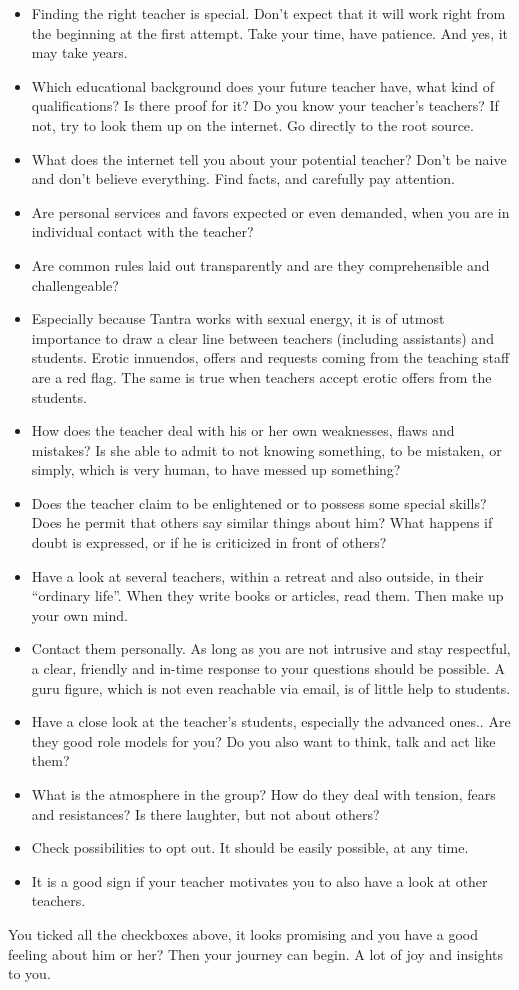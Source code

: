 \begin{itemize}
\item Finding the right teacher is special. Don't expect that it will work right from the beginning at the first attempt. Take your time, have patience. And yes, it may take years.
\item Which educational background does your future teacher have, what kind of qualifications? Is there proof for it? Do you know your teacher's teachers? If not, try to look them up on the internet. Go directly to the root source.
\item What does the internet tell you about your potential teacher? Don't be naive and don’t believe everything. Find facts, and carefully pay attention.
\item Are personal services and favors expected or even demanded, when you are in individual contact with the teacher?
\item Are common rules laid out transparently and are they comprehensible and challengeable?
\item Especially because Tantra works with sexual energy, it is of utmost importance to draw a clear line between teachers (including assistants) and students. Erotic innuendos, offers and requests coming from the teaching staff are a red flag. The same is true when teachers accept erotic offers from the students.
\item How does the teacher deal with his or her own weaknesses, flaws and mistakes? Is she able to admit to not knowing something, to be mistaken, or simply, which is very human, to have messed up something?
\item Does the teacher claim to be enlightened or to possess some special skills? Does he permit that others say similar things about him? What happens if doubt is expressed, or if he is criticized in front of others?
\item Have a look at several teachers, within a retreat and also outside, in their ``ordinary life''. When they write books or articles, read them. Then make up your own mind.
\item Contact them personally. As long as you are not intrusive and stay respectful, a clear, friendly and in-time response to your questions should be possible. A guru figure, which is not even reachable via email, is of little help to students.
\item Have a close look at the teacher’s students, especially the advanced ones.. Are they good role models for you? Do you also want to think, talk and act like them?
\item What is the atmosphere in the group? How do they deal with tension, fears and resistances? Is there laughter, but not about others?
\item Check possibilities to opt out. It should be easily possible, at any time.
\item It is a good sign if your teacher motivates you to also have a look at other teachers.
\end{itemize}

You ticked all the checkboxes above, it looks promising and you have a good feeling about him or her? Then your journey can begin. A lot of joy and insights to you.
